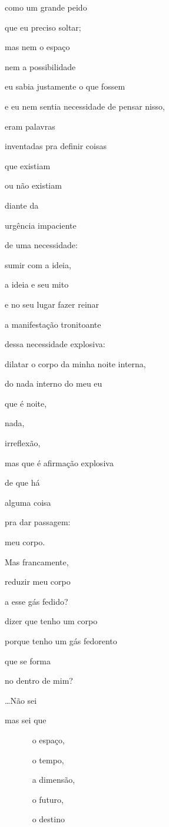 como um grande peido

que eu preciso soltar;

mas nem o espaço

nem a possibilidade

eu sabia justamente o que fossem

e eu nem sentia necessidade de pensar nisso,

eram palavras

inventadas pra definir coisas

que existiam

ou não existiam

diante da

urgência impaciente

de uma necessidade:

sumir com a ideia,

a ideia e seu mito

e no seu lugar fazer reinar

a manifestação tronitoante

dessa necessidade explosiva:

dilatar o corpo da minha noite interna,


do nada interno do meu eu

que é noite,

nada,

irreflexão,

mas que é afirmação explosiva

de que há

alguma coisa

pra dar passagem:

meu corpo.

Mas francamente, 

reduzir meu corpo

a esse gás fedido?

dizer que tenho um corpo

porque tenho um gás fedorento

que se forma

no dentro de mim?

\ldots{}Não sei

mas sei que

~~~~~~ o espaço,

~~~~~~ o tempo, 

~~~~~~ a dimensão,

~~~~~~ o futuro,

~~~~~~ o destino


